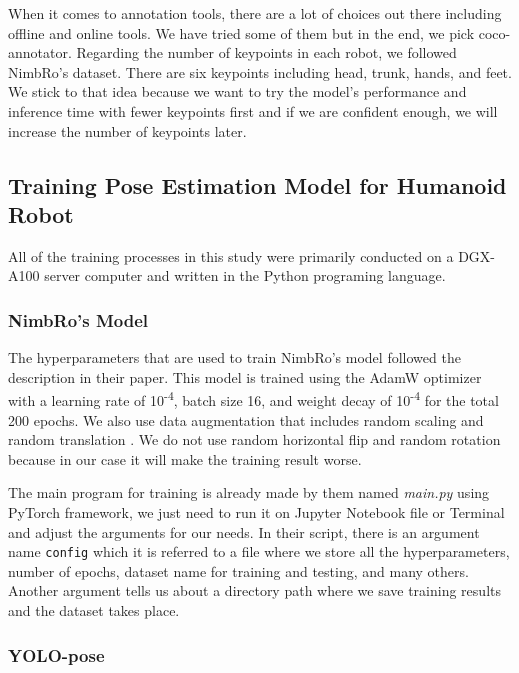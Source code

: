 When it comes to annotation tools, there are a lot of choices out there including offline and online tools. We have tried some of them but in the end, we pick coco-annotator.
Regarding the number of keypoints in each robot, we followed NimbRo's dataset.
There are six keypoints including head, trunk, hands, and feet. We stick to that idea because we want to try the model's performance and inference time with fewer keypoints first and if we are confident enough, we will increase the number of keypoints later.


\subsection{Training Pose Estimation Model for Humanoid Robot}
\label{subsec:training-robot}

All of the training processes in this study were primarily conducted on a DGX-A100 server computer and written in the Python programing language.

\subsubsection{NimbRo's Model}
\label{subsubsec:training-nimbro-model}

The hyperparameters that are used to train NimbRo's model followed the description in their paper.
This model is trained using the AdamW optimizer with a learning rate of 10\textsuperscript{-4},
batch size 16, and weight decay of 10\textsuperscript{-4} for the total 200 epochs.
We also use data augmentation that includes random scaling and random translation \citep{amini2021}.
We do not use random horizontal flip and random rotation because in our case it will make the training result worse.

The main program for training is already made by them named \emph{main.py} using PyTorch framework, we just need to run it on Jupyter Notebook file or Terminal and adjust the arguments for our needs.
In their script, there is an argument name \verb|config| which it is referred to a file where we store all the hyperparameters, number of epochs, dataset name for training and testing, and many others. 
Another argument tells us about a directory path where we save training results and the dataset takes place.

\subsubsection{YOLO-pose}
\label{subsubsec:training-yolo-pose}

